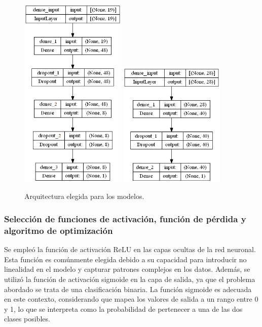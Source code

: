 \begin{figure}[H]
	\centering
	\hspace{1em}
	{\includegraphics[width=0.45\textwidth]{./Figures/arquitectura_dataset1.png}}
	\hspace{1em}
	{\includegraphics[width=0.45\textwidth]{./Figures/arquitectura_dataset2.png}}
	\caption{Arquitectura elegida para los modelos.}\label{fig:arquitectura_datasets}
\end{figure}

\subsubsection{Selección de funciones de activación, función de pérdida y algoritmo de optimización}
Se empleó la función de activación ReLU en las capas ocultas de la red neuronal. Esta función es 
comúnmente elegida debido a su capacidad para introducir no linealidad en el modelo y capturar 
patrones complejos en los datos. Además, se utilizó la función de activación sigmoide en la capa 
de salida, ya que el problema abordado se trata de una clasificación binaria. La función sigmoide
 es adecuada en este contexto, considerando que mapea los valores de salida a un rango entre 0 y 1, 
 lo que se interpreta como la probabilidad de pertenecer a una de las dos clases posibles.

